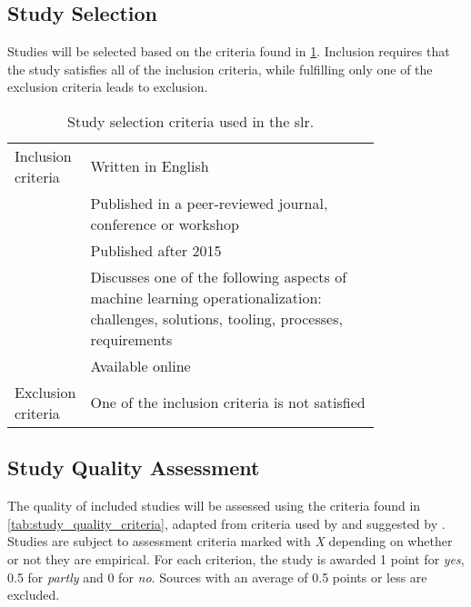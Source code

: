 \subsection{Study Selection}
Studies will be selected based on the criteria found in \cref{tab:selection_criteria}.
Inclusion requires that the study satisfies all of the inclusion criteria, while fulfilling only one of the exclusion criteria leads to exclusion.
\begin{table}[h]
    \centering
    \begin{tabular}{l|p{0.8\linewidth}}
    Inclusion criteria &  Written in English \\
    & Published in a peer-reviewed journal, conference or workshop \\
    & Published after 2015\\
    & Discusses one of the following aspects of machine learning operationalization: challenges, solutions, tooling, processes, requirements \\
    & Available online\\
    \hline
    Exclusion criteria & One of the inclusion criteria is not satisfied\\
    \end{tabular}
    \caption{Study selection criteria used in the \acrshort{slr}.}
    \label{tab:selection_criteria}
\end{table}

\subsection{Study Quality Assessment}
The quality of included studies will be assessed using the criteria found in \cref{tab:study_quality_criteria}, adapted from criteria used by \cite{Giray2021} and suggested by \cite{Garousi2016}.
Studies are subject to assessment criteria marked with \emph{X} depending on whether or not they are empirical.
For each criterion, the study is awarded 1 point for \emph{yes}, 0.5 for \emph{partly} and 0 for \emph{no}.
Sources with an average of 0.5 points or less are excluded.


